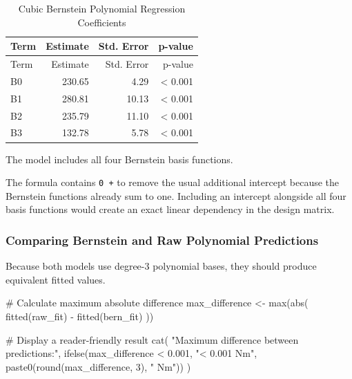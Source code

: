 \documentclass[
  letterpaper,
  DIV=11,
  numbers=noendperiod]{scrreprt}
\newenvironment{Shaded}{\begin{snugshade}}{\end{snugshade}}
\newcommand{\CommentTok}[1]{\textcolor[rgb]{0.37,0.37,0.37}{#1}}
\newcommand{\DecValTok}[1]{\textcolor[rgb]{0.68,0.00,0.00}{#1}}
\newcommand{\FloatTok}[1]{\textcolor[rgb]{0.68,0.00,0.00}{#1}}
\newcommand{\FunctionTok}[1]{\textcolor[rgb]{0.28,0.35,0.67}{#1}}
\newcommand{\NormalTok}[1]{\textcolor[rgb]{0.00,0.23,0.31}{#1}}
\newcommand{\OtherTok}[1]{\textcolor[rgb]{0.00,0.23,0.31}{#1}}
\newcommand{\SpecialCharTok}[1]{\textcolor[rgb]{0.37,0.37,0.37}{#1}}
\newcommand{\StringTok}[1]{\textcolor[rgb]{0.13,0.47,0.30}{#1}}
\begin{document}
\begin{longtable}[]{@{}lrrr@{}}
\caption{Cubic Bernstein Polynomial Regression
Coefficients}\tabularnewline
\toprule\noalign{}
Term & Estimate & Std. Error & p-value \\
\midrule\noalign{}
\endfirsthead
\toprule\noalign{}
Term & Estimate & Std. Error & p-value \\
\midrule\noalign{}
\endhead
\bottomrule\noalign{}
\endlastfoot
B0 & 230.65 & 4.29 & \textless{} 0.001 \\
B1 & 280.81 & 10.13 & \textless{} 0.001 \\
B2 & 235.79 & 11.10 & \textless{} 0.001 \\
B3 & 132.78 & 5.78 & \textless{} 0.001 \\
\end{longtable}

The model includes all four Bernstein basis functions.

The formula contains \texttt{0\ +} to remove the usual additional
intercept because the Bernstein functions already sum to one. Including
an intercept alongside all four basis functions would create an exact
linear dependency in the design matrix.

\subsubsection{Comparing Bernstein and Raw Polynomial
Predictions}\label{comparing-bernstein-and-raw-polynomial-predictions}

Because both models use degree-3 polynomial bases, they should produce
equivalent fitted values.

\begin{Shaded}
\begin{Highlighting}[]
\CommentTok{\# Calculate maximum absolute difference}
\NormalTok{max\_difference }\OtherTok{\textless{}{-}} \FunctionTok{max}\NormalTok{(}\FunctionTok{abs}\NormalTok{(}
  \FunctionTok{fitted}\NormalTok{(raw\_fit) }\SpecialCharTok{{-}} \FunctionTok{fitted}\NormalTok{(bern\_fit)}
\NormalTok{))}

\CommentTok{\# Display a reader{-}friendly result}
\FunctionTok{cat}\NormalTok{(}
  \StringTok{"Maximum difference between predictions:"}\NormalTok{,}
  \FunctionTok{ifelse}\NormalTok{(max\_difference }\SpecialCharTok{\textless{}} \FloatTok{0.001}\NormalTok{,}
         \StringTok{"\textless{} 0.001 Nm"}\NormalTok{,}
         \FunctionTok{paste0}\NormalTok{(}\FunctionTok{round}\NormalTok{(max\_difference, }\DecValTok{3}\NormalTok{), }\StringTok{" Nm"}\NormalTok{))}
\NormalTok{)}
\end{Highlighting}
\end{Shaded}
\end{document}
